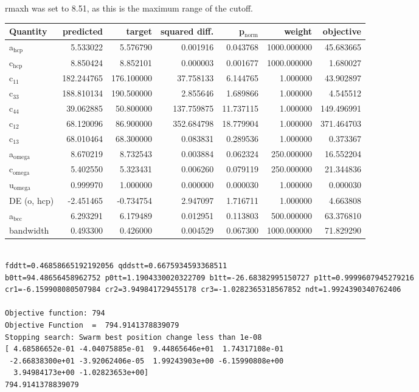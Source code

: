 \documentclass[11pt]{article}
\begin{document}
rmaxh was set to 8.51, as this is the maximum range of the cutoff. 

\begin{center}
\begin{tabular}{lrrrrrr}
Quantity & predicted & target & squared diff. & p\(_{\text{norm}}\) & weight & objective\\
\hline
a\(_{\text{hcp}}\) & 5.533022 & 5.576790 & 0.001916 & 0.043768 & 1000.000000 & 45.683665\\
c\(_{\text{hcp}}\) & 8.850424 & 8.852101 & 0.000003 & 0.001677 & 1000.000000 & 1.680027\\
c\(_{\text{11}}\) & 182.244765 & 176.100000 & 37.758133 & 6.144765 & 1.000000 & 43.902897\\
c\(_{\text{33}}\) & 188.810134 & 190.500000 & 2.855646 & 1.689866 & 1.000000 & 4.545512\\
c\(_{\text{44}}\) & 39.062885 & 50.800000 & 137.759875 & 11.737115 & 1.000000 & 149.496991\\
c\(_{\text{12}}\) & 68.120096 & 86.900000 & 352.684798 & 18.779904 & 1.000000 & 371.464703\\
c\(_{\text{13}}\) & 68.010464 & 68.300000 & 0.083831 & 0.289536 & 1.000000 & 0.373367\\
a\(_{\text{omega}}\) & 8.670219 & 8.732543 & 0.003884 & 0.062324 & 250.000000 & 16.552204\\
c\(_{\text{omega}}\) & 5.402550 & 5.323431 & 0.006260 & 0.079119 & 250.000000 & 21.344836\\
u\(_{\text{omega}}\) & 0.999970 & 1.000000 & 0.000000 & 0.000030 & 1.000000 & 0.000030\\
DE (o, hcp) & -2.451465 & -0.734754 & 2.947097 & 1.716711 & 1.000000 & 4.663808\\
a\(_{\text{bcc}}\) & 6.293291 & 6.179489 & 0.012951 & 0.113803 & 500.000000 & 63.376810\\
bandwidth & 0.493300 & 0.426000 & 0.004529 & 0.067300 & 1000.000000 & 71.829290\\
\end{tabular}
\end{center}

\begin{verbatim}

fddtt=0.46858665192192056 qddstt=0.6675934593368511 
b0tt=94.48656458962752 p0tt=1.1904330020322709 b1tt=-26.68382995150727 p1tt=0.9999607945279216 
cr1=-6.159908080507984 cr2=3.949841729455178 cr3=-1.0282365318567852 ndt=1.9924390340762406

Objective function: 794
Objective Function  =  794.9141378839079
Stopping search: Swarm best position change less than 1e-08
[ 4.68586652e-01 -4.04075885e-01  9.44865646e+01  1.74317108e-01
 -2.66838300e+01 -3.92062406e-05  1.99243903e+00 -6.15990808e+00
  3.94984173e+00 -1.02823653e+00]
794.9141378839079
\end{verbatim}
\end{document}
